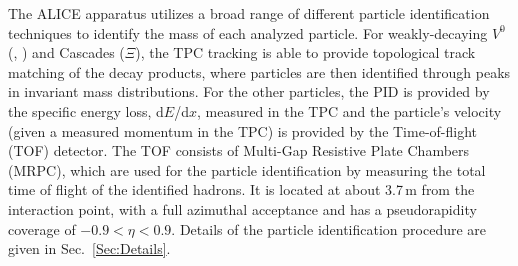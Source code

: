 The ALICE apparatus utilizes a broad range of different particle identification techniques to identify the mass of each analyzed particle. For weakly-decaying $V^0$ (\kzero, \lmb) and Cascades ($\Xi$), the TPC tracking is able to provide topological track matching of the decay products, where particles are then identified through peaks in invariant mass distributions. For the other particles, the PID is provided by the specific energy loss, d$E$/d$x$, measured in the TPC and the particle's velocity (given a measured momentum in the TPC) is provided by the Time-of-flight (TOF) detector. The TOF consists of Multi-Gap Resistive Plate Chambers (MRPC), which are used for the particle identification by measuring the total time of flight of the identified hadrons. It is located at about 3.7\,m from the interaction point, with a full azimuthal acceptance and has a pseudorapidity coverage of $-0.9< \eta <0.9$. Details of the particle identification procedure are given in Sec.~\ref{Sec:Details}.
